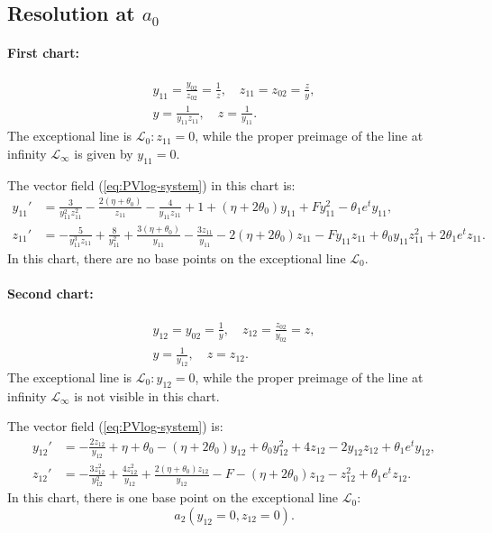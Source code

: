 \subsection{Resolution at $a_0$}\label{a0-blow}
\paragraph{First chart:}
\begin{gather*}
y_{11}=\frac{y_{02}}{z_{02}}=\frac{1}{z},
\quad
z_{11}=z_{02}=\frac{z}{y},
\\
y=\frac{1}{y_{11}z_{11}},
\quad
z=\frac{1}{y_{11}}.
\end{gather*}
The exceptional line is $\mathcal{L}_0 : z_{11}=0$, while the proper preimage of the line at infinity $\mathcal{L}_{\infty}$ is given by $y_{11}=0$. 

The vector field (\ref{eq:PVlog-system}) in this chart is:
$$
\begin{aligned}
y_{11}'&=
\frac{3}{y_{11}^2 z_{11}^2} - \frac{ 2 (\eta+ \theta_0)}{z_{11}} - \frac{4}{y_{11} z_{11}}+
1 + (\eta  + 2 \theta_0) y_{11} + F y_{11}^2 - \theta_1 e^t y_{11}
,
\\
z_{11}'&=
 - \frac{5}{y_{11}^3 z_{11}}+
\frac{8}{y_{11}^2} + \frac{3( \eta+\theta_0)}{y_{11}}- \frac{3 z_{11}}{y_{11}} - 2( \eta+2 \theta_0) z_{11}  - F y_{11} z_{11} + \theta_0 y_{11} z_{11}^2+2  \theta_1 e^t z_{11}
.
\end{aligned}
$$
In this chart, there are no base points on the exceptional line $\mathcal{L}_0$.


\paragraph{Second chart:}
\begin{gather*}
y_{12}=y_{02}=\frac{1}{y},
\quad
z_{12}=\frac{z_{02}}{y_{02}}=z,
\\
y=\frac{1}{y_{12}},
\quad
z=z_{12}.
\end{gather*}
The exceptional line is $\mathcal{L}_0 : y_{12}=0$, while the proper preimage of the line at infinity $\mathcal{L}_{\infty}$ is not visible in this chart. 


The vector field (\ref{eq:PVlog-system}) is:
$$
\begin{aligned}
y_{12}'&=
 -\frac{ 2 z_{12}}{y_{12}}+\eta + \theta_0 - (\eta + 2 \theta_0) y_{12} + \theta_0 y_{12}^2 + 4 z_{12}  - 2 y_{12} z_{12}
 +\theta_1 e^t y_{12}
,
\\
z_{12}'&=
- \frac{3 z_{12}^2}{y_{12}^2} + \frac{4 z_{12}^2}{y_{12}}+ \frac{2 (\eta + \theta_0) z_{12}}{y_{12}}-F - (\eta + 2 \theta_0) z_{12}  - z_{12}^2 
+\theta_1 e^t z_{12}
.
\end{aligned}
$$
In this chart, there is one base point on the exceptional line $\mathcal{L}_0$:
$$
a_2(y_{12}=0,z_{12}=0).
$$



